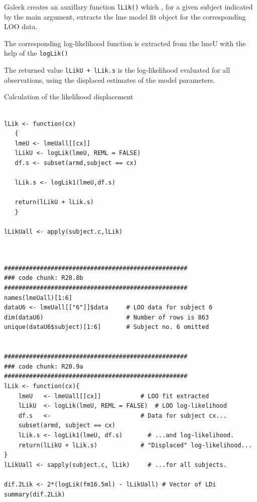 \documentclass[a4paper,12pt]{article}
\begin{document}


Galeck creates an auxillary function \texttt{lLik()} which , for a given subject indicated by the main argument, extracts the lme model fit object for the
corresponding LOO data.


The corresponding log-likelihood function is extracted from the lmeU with the help of the \texttt{logLik()}


The returned value \texttt{lLikU + lLik.s} is the log-likelihood evaluated for all observations, using the displaced estimates of the model parameters.


Calculation of the likelihood displacement

\begin{framed}
\begin{verbatim}

lLik <- function(cx)
   {
   lmeU <- lmeUall[[cx]]
   lLikU <- logLik(lmeU, REML = FALSE)
   df.s <- subset(armd,subject == cx)
 
   lLik.s <- logLik1(lmeU,df.s)

   return(lLikU + lLik.s)
   }

lLikUall <- apply(subject.c,lLik)

\end{verbatim}
\end{framed}

%

\begin{framed}
	\begin{verbatim}


###################################################
### code chunk: R20.8b
###################################################
names(lmeUall)[1:6]                             
dataU6 <- lmeUall[["6"]]$data     # LOO data for subject 6
dim(dataU6)                       # Number of rows is 863
unique(dataU6$subject)[1:6]       # Subject no. 6 omitted


###################################################
### code chunk: R20.9a
###################################################
lLik <- function(cx){                  
	lmeU   <- lmeUall[[cx]]           # LOO fit extracted 
	lLikU  <- logLik(lmeU, REML = FALSE)  # LOO log-likelihood
	df.s   <-                         # Data for subject cx...
	subset(armd, subject == cx)                 
	lLik.s <- logLik1(lmeU, df.s)       # ...and log-likelihood.
	return(lLikU + lLik.s)            # "Displaced" log-likelihood...
}
lLikUall <- sapply(subject.c, lLik)     # ...for all subjects.         

dif.2Lik <- 2*(logLik(fm16.5ml) - lLikUall) # Vector of LDi
summary(dif.2Lik)

\end{verbatim}
\end{framed}
\end{document}
